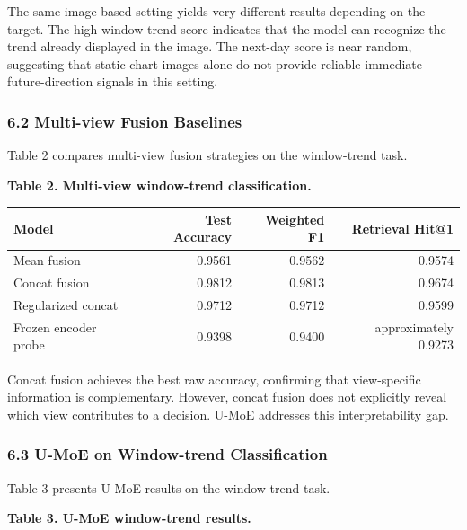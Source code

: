 \documentclass[
]{article}
\begin{document}
The same image-based setting yields very different results depending on
the target. The high window-trend score indicates that the model can
recognize the trend already displayed in the image. The next-day score
is near random, suggesting that static chart images alone do not provide
reliable immediate future-direction signals in this setting.

\subsubsection{6.2 Multi-view Fusion
Baselines}\label{multi-view-fusion-baselines}

Table 2 compares multi-view fusion strategies on the window-trend task.

\textbf{Table 2. Multi-view window-trend classification.}

\begin{longtable}[]{@{}lrrr@{}}
\toprule\noalign{}
Model & Test Accuracy & Weighted F1 & Retrieval Hit@1 \\
\midrule\noalign{}
\endhead
\bottomrule\noalign{}
\endlastfoot
Mean fusion & 0.9561 & 0.9562 & 0.9574 \\
Concat fusion & 0.9812 & 0.9813 & 0.9674 \\
Regularized concat & 0.9712 & 0.9712 & 0.9599 \\
Frozen encoder probe & 0.9398 & 0.9400 & approximately 0.9273 \\
\end{longtable}

Concat fusion achieves the best raw accuracy, confirming that
view-specific information is complementary. However, concat fusion does
not explicitly reveal which view contributes to a decision. U-MoE
addresses this interpretability gap.

\subsubsection{6.3 U-MoE on Window-trend
Classification}\label{u-moe-on-window-trend-classification}

Table 3 presents U-MoE results on the window-trend task.

\textbf{Table 3. U-MoE window-trend results.}
\end{document}
